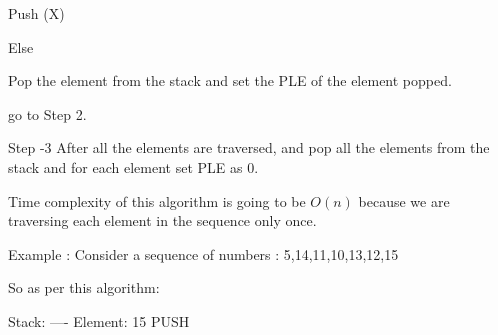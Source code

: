 \documentclass[letterpaper,portrait,12pt]{article}
\begin{document}
\begin{flushleft}
		Push (X)
\end{flushleft}


\begin{flushleft}
	 Else
\end{flushleft}


\begin{flushleft}
		Pop the element from the stack and set the PLE of the element popped.
\end{flushleft}


\begin{flushleft}
		go to Step 2.
\end{flushleft}


\begin{flushleft}

\end{flushleft}


\begin{flushleft}
Step -3 After all the elements are traversed, and pop all the elements from the stack and for each element set PLE as 0.
\end{flushleft}


\begin{flushleft}

\end{flushleft}


\begin{flushleft}
Time complexity of this algorithm is going to be $O(n)$ because we are traversing each element in the  sequence only once.
\end{flushleft}


\begin{flushleft}

\end{flushleft}


\begin{flushleft}
Example : Consider a sequence of numbers : 5,14,11,10,13,12,15
\end{flushleft}


\begin{flushleft}

\end{flushleft}


\begin{flushleft}
So as per this algorithm:
\end{flushleft}


\begin{flushleft}
Stack: ----		Element: 15		PUSH
\end{flushleft}
\end{document}
